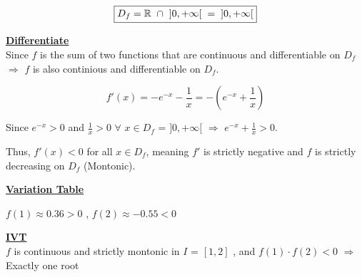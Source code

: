 \[\boxed{D_{f} = \mathbb{R}\hspace{0.2cm}\cap\hspace{0.2cm}]0,+\infty[\hspace{0.2cm}=\hspace{0.2cm}]0,+\infty[}\]

\vspace{0.5cm}

\textbf{\underline{Differentiate}}\\[0.2cm]
Since \( f \) is the sum of two functions that are continuous and differentiable on \( D_f \) \(\Rightarrow\) \( f \) is also continious and differentiable on \( D_f \).


\[
f'(x) = -e^{-x} - \frac{1}{x} = -(e^{-x} + \frac{1}{x})
\]

\vspace{0.5cm}

Since \hspace{0.2cm}\( e^{-x} > 0 \) \hspace{0.2cm} and \hspace{0.2cm}\( \frac{1}{x} > 0 \) \hspace{0.2cm} \(\forall\) \hspace{0.2cm}\( x \in D_f\) = \(]0, +\infty[ \)\hspace{0.2cm} $\Rightarrow$  \hspace{0.2cm}\( e^{-x} + \frac{1}{x} > 0 \).  

\vspace{0.2cm}

Thus, \( f'(x) < 0 \) for all \( x \in D_f \), meaning \( f' \) is strictly negative and \( f \) is strictly decreasing on \( D_f \) (Montonic).

\vspace{1cm}

\textbf{\underline{Variation Table}}\\[0.25cm]

\begin{center}
\end{center}

\vspace{0.5cm}
\(f(1) \approx 0.36 > 0 \) , \(f(2) \approx -0.55 < 0\)

\vspace{1cm}
\textbf{\underline{IVT}}\\[0.25cm]
\(f\) is continuous and strictly montonic in \(I\) = \([1,2]\) , and \(f(1)\cdot f(2) < 0\) \(\Rightarrow\) Exactly one root

